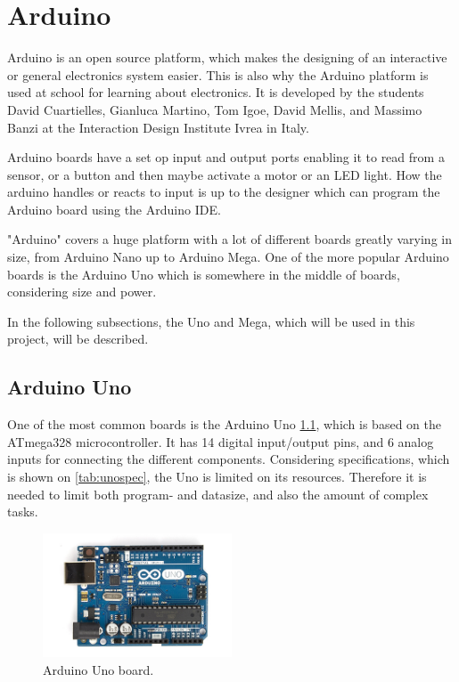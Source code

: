 \chapter{Arduino}
\label{sec:arduino}
Arduino is an open source platform, which makes the designing of an interactive or general electronics system easier. This is also why the Arduino platform is used at school for learning about electronics. It is developed by the students David Cuartielles, Gianluca Martino, Tom Igoe, David Mellis, and Massimo Banzi at the Interaction Design Institute Ivrea in Italy\cite{makingofarduino}.

Arduino boards have a set op input and output ports enabling it to read from a sensor, or a button and then maybe activate a motor or an LED light. How the arduino handles or reacts to input is up to the designer which can program the Arduino board using the Arduino IDE.

"Arduino" covers a huge platform with a lot of different boards greatly varying in size, from Arduino Nano up to Arduino Mega. One of the more popular Arduino boards is the Arduino Uno which is somewhere in the middle of boards, considering size and power.

In the following subsections, the Uno and Mega, which will be used in this project, will be described.

\section{Arduino Uno}
One of the most common boards is the Arduino Uno \ref{fig:arduinouno}, which is based on the ATmega328 microcontroller. It has 14 digital input/output pins, and 6 analog inputs for connecting the different components. Considering specifications, which is shown on \ref{tab:unospec}, the Uno is limited on its resources. Therefore it is needed to limit both program- and datasize, and also the amount of complex tasks.
\begin{figure}[h!]
\centering
\includegraphics[width=0.5\textwidth]{chapters/analysis/figs/ArduinoUno.jpg}
\caption{Arduino Uno board\cite{arduinointroduction}.}
\label{fig:arduinouno}
\end{figure}

